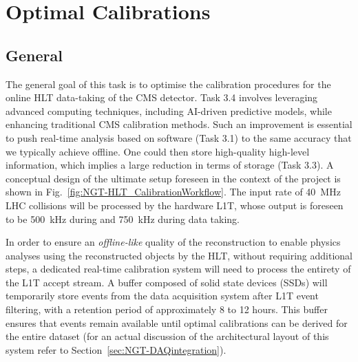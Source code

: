 \chapter{Optimal Calibrations} \label{sec:OpCa_HLT}
\section{General}

The general goal of this task is to optimise the calibration procedures for the online HLT data-taking of the CMS detector. 
Task 3.4 involves leveraging advanced computing techniques, including AI-driven predictive models, while enhancing traditional CMS calibration methods.
Such an improvement is essential to push real-time analysis based on \Rthree software (Task 3.1) to the same accuracy that we typically achieve offline. 
One could then store high-quality high-level information, which implies a large reduction in terms of storage (Task 3.3).
A conceptual design of the ultimate setup foreseen in the context of the \Rthree project is shown in  Fig.~\ref{fig:NGT-HLT_CalibrationWorkflow}.
The input rate of \SI{40}{\mega\hertz} LHC collisions will be processed by the hardware L1T, whose output is foreseen to be \SI{500}{\kilo\hertz} during \Runfour and \SI{750}{\kilo\hertz} during \Runfive data taking.

In order to ensure an \emph{offline-like} quality of the reconstruction to enable physics analyses using the reconstructed objects by the HLT, without requiring additional steps, a dedicated real-time calibration system will need to process the entirety of the L1T accept stream.
A buffer composed of solid state devices (SSDs) will temporarily store events from the data acquisition system after L1T event filtering, with a retention period of approximately 8 to 12 hours. 
This buffer ensures that events remain available until optimal calibrations can be derived for the entire dataset (for an actual discussion of the architectural layout of this system refer to Section~\ref{sec:NGT-DAQintegration}).

